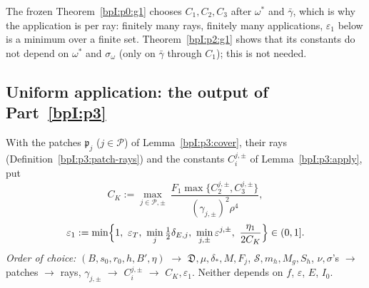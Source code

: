 \begin{remark}\label{bpI:p3:constants-order}
The frozen Theorem~\ref{bpI:p0:g1} chooses $C_1,C_2,C_3$ after $\omega^*$ and $\bar\gamma$, which is why the application is per ray: finitely many rays, finitely many applications, $\varepsilon_1$ below is a minimum over a finite set.
Theorem~\ref{bpI:p2:g1} shows that its constants do not depend on $\omega^*$ and $\sigma_\omega$ (only on $\bar\gamma$ through $C_1$); this is not needed.
\end{remark}

\subsection{Uniform application: the output of Part~\ref{bpI:p3}}\label{bpI:p3:sec-output}

\begin{definition}\label{bpI:p3:uniform}
With the patches $\mathfrak p_j$ ($j\in\mathcal P$) of Lemma~\ref{bpI:p3:cover}, their rays (Definition~\ref{bpI:p3:patch-rays}) and the constants $C_i^{j,\pm}$ of Lemma~\ref{bpI:p3:apply}, put
\[
C_K:=\max_{j\in\mathcal P,\pm}\ \frac{F_1\max\{C_2^{j,\pm},C_3^{j,\pm}\}}{(\gamma_{j,\pm})^2\rho^4},
\]
\[
\varepsilon_1:=\min\Bigl\{1,\ \varepsilon_T,\ \min_{j}\tfrac12\delta_{E,j},\ \min_{j,\pm}\varepsilon^{j,\pm},\ \frac{\eta_1}{2C_K}\Bigr\}\in(0,1].
\]
\emph{Order of choice:} $(B,s_0,r_0,h,B',\eta)$ $\to$ $\mathfrak D,\mu,\delta_*,M,F_j$, $\mathcal S,m_h,M_g,S_h$, $\nu,\sigma$'s $\to$ patches $\to$ rays, $\gamma_{j,\pm}$ $\to$ $C_i^{j,\pm}$ $\to$ $C_K,\varepsilon_1$.
Neither depends on $f$, $\varepsilon$, $E$, $I_0$.
\end{definition}

